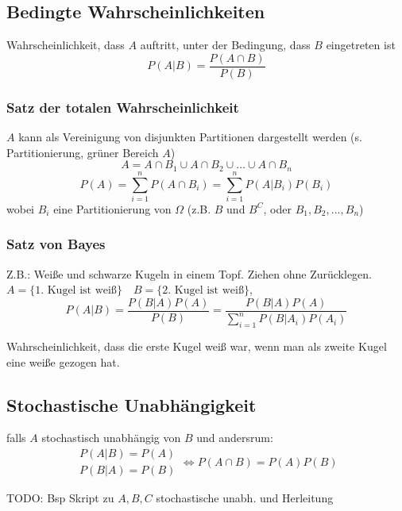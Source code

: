 \subsection{Bedingte Wahrscheinlichkeiten}
\begin{emphbox}
    Wahrscheinlichkeit, dass $A$ auftritt, unter der Bedingung, dass $B$ eingetreten ist
    \begin{equation*}
        P(A|B) = \frac{P(A\cap B)}{P(B)}
    \end{equation*}
\end{emphbox}

\begin{sectionbox}
    \subsubsection{Satz der totalen Wahrscheinlichkeit}
    $A$ kann als Vereinigung von disjunkten Partitionen dargestellt werden (s. Partitionierung, grüner Bereich $A$)
    \begin{equation*}
        A=A\cap B_1 \cup A\cap B_2 \cup \dots \cup A\cap B_n
    \end{equation*}
    \begin{equation*}
        P(A)=\sum_{i=1}^{n}P(A\cap B_i)=\sum_{i=1}^{n}P(A|B_i)P(B_i)
    \end{equation*}
    wobei $B_i$ eine Partitionierung von $\Omega$ (z.B. $B$ und $B^C$, oder $B_1, B_2, ..., B_n$)
\end{sectionbox}

\begin{sectionbox}
    \subsubsection{Satz von Bayes}
    Z.B.: Weiße und schwarze Kugeln in einem Topf. Ziehen ohne Zurücklegen. \\
    $A = \{1.\text{ Kugel ist weiß}\} \quad B = \{2.\text{ Kugel ist weiß}\}$,
    \begin{equation*}
        P(A|B)=\frac{P(B|A)P(A)}{P(B)}=\frac{P(B|A)P(A)}{\sum_{i=1}^{n}P(B|A_i)P(A_i)}
    \end{equation*}

    Wahrscheinlichkeit, dass die erste Kugel weiß war, wenn man als zweite Kugel eine weiße gezogen hat.
\end{sectionbox}


\subsection{Stochastische Unabhängigkeit}
\begin{emphbox}
    falls $A$ stochastisch unabhängig von $B$ und andersrum:
    \begin{equation*}
        \begin{matrix}
            P(A|B)=P(A) \\
            P(B|A)=P(B)
        \end{matrix}
        \Longleftrightarrow P(A\cap B) = P(A)P(B)
    \end{equation*}

    TODO: Bsp Skript zu $A,B,C$ stochastische unabh. und Herleitung
\end{emphbox}

